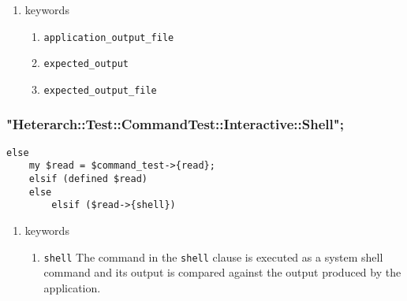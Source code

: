 \documentclass[11pt]{article}
\begin{document}
\begin{enumerate}
\item keywords
\label{sec-4-4-6-1}
\begin{enumerate}
\item \texttt{application\_output\_file}
\label{sec-4-4-6-1-1}
\item \texttt{expected\_output}
\label{sec-4-4-6-1-2}
\item \texttt{expected\_output\_file}
\label{sec-4-4-6-1-3}
\end{enumerate}
\end{enumerate}

\subsubsection{"Heterarch::Test::CommandTest::Interactive::Shell";}
\label{sec-4-4-7}
\begin{verbatim}
else
    my $read = $command_test->{read};
    elsif (defined $read)
	else
	    elsif ($read->{shell})
\end{verbatim}

\begin{enumerate}
\item keywords
\label{sec-4-4-7-1}
\begin{enumerate}
\item \texttt{shell}
\label{sec-4-4-7-1-1}
The command in the \verb~shell~ clause is executed as a system shell
command and its output is compared against the output produced by the
application.
\end{enumerate}
\end{enumerate}
\end{document}
